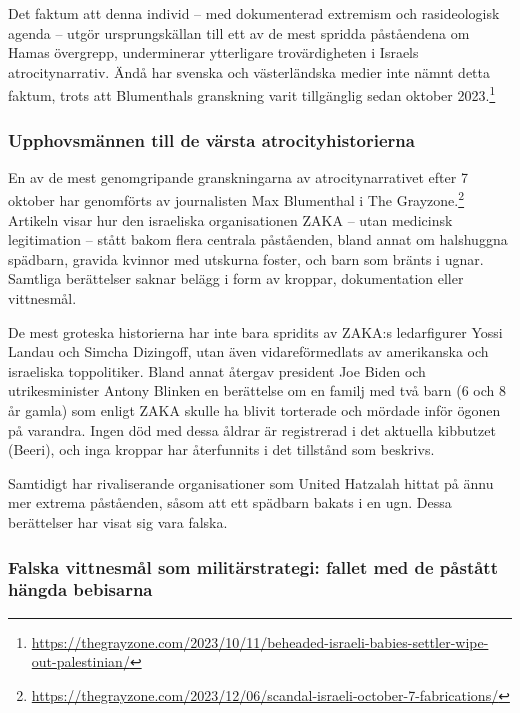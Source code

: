 Det faktum att denna individ – med dokumenterad extremism och rasideologisk agenda – utgör ursprungskällan till ett av de mest spridda påståendena om Hamas övergrepp, underminerar ytterligare trovärdigheten i Israels atrocitynarrativ. Ändå har svenska och västerländska medier inte nämnt detta faktum, trots att Blumenthals granskning varit tillgänglig sedan oktober 2023.\footnote{\url{https://thegrayzone.com/2023/10/11/beheaded-israeli-babies-settler-wipe-out-palestinian/}}

\subsubsection*{Upphovsmännen till de värsta atrocityhistorierna}

En av de mest genomgripande granskningarna av atrocitynarrativet efter 7 oktober har genomförts av journalisten Max Blumenthal i The Grayzone.\footnote{\url{https://thegrayzone.com/2023/12/06/scandal-israeli-october-7-fabrications/}} Artikeln visar hur den israeliska organisationen ZAKA – utan medicinsk legitimation – stått bakom flera centrala påståenden, bland annat om halshuggna spädbarn, gravida kvinnor med utskurna foster, och barn som bränts i ugnar. Samtliga berättelser saknar belägg i form av kroppar, dokumentation eller vittnesmål.  

De mest groteska historierna har inte bara spridits av ZAKA:s ledarfigurer Yossi Landau och Simcha Dizingoff, utan även vidareförmedlats av amerikanska och israeliska toppolitiker. Bland annat återgav president Joe Biden och utrikesminister Antony Blinken en berättelse om en familj med två barn (6 och 8 år gamla) som enligt ZAKA skulle ha blivit torterade och mördade inför ögonen på varandra. Ingen död med dessa åldrar är registrerad i det aktuella kibbutzet (Beeri), och inga kroppar har återfunnits i det tillstånd som beskrivs.

Samtidigt har rivaliserande organisationer som United Hatzalah hittat på ännu mer extrema påståenden, såsom att ett spädbarn bakats i en ugn. Dessa berättelser har visat sig vara falska.



\subsubsection*{Falska vittnesmål som militärstrategi: fallet med de påstått hängda bebisarna}

